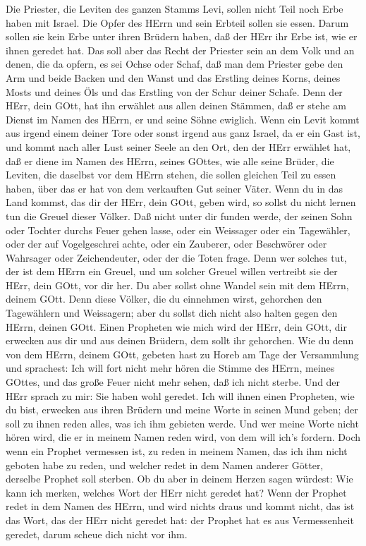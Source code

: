  Die Priester, die Leviten des ganzen Stamms Levi, sollen
nicht Teil noch Erbe haben mit Israel. Die Opfer des HErrn und sein
Erbteil sollen sie essen.  Darum sollen sie kein Erbe unter
ihren Brüdern haben, daß der HErr ihr Erbe ist, wie er ihnen geredet
hat.  Das soll aber das Recht der Priester sein an dem Volk
und an denen, die da opfern, es sei Ochse oder Schaf, daß man dem
Priester gebe den Arm und beide Backen und den Wanst  und
das Erstling deines Korns, deines Mosts und deines Öls und das Erstling
von der Schur deiner Schafe.  Denn der HErr, dein GOtt, hat
ihn erwählet aus allen deinen Stämmen, daß er stehe am Dienst im Namen
des HErrn, er und seine Söhne ewiglich.  Wenn ein Levit
kommt aus irgend einem deiner Tore oder sonst irgend aus ganz Israel, da
er ein Gast ist, und kommt nach aller Lust seiner Seele an den Ort, den
der HErr erwählet hat,  daß er diene im Namen des HErrn,
seines GOttes, wie alle seine Brüder, die Leviten, die daselbst vor dem
HErrn stehen,  die sollen gleichen Teil zu essen haben, über
das er hat von dem verkauften Gut seiner Väter.  Wenn du in
das Land kommst, das dir der HErr, dein GOtt, geben wird, so sollst du
nicht lernen tun die Greuel dieser Völker.  Daß nicht unter
dir funden werde, der seinen Sohn oder Tochter durchs Feuer gehen lasse,
oder ein Weissager oder ein Tagewähler, oder der auf Vogelgeschrei
achte, oder ein Zauberer,  oder Beschwörer oder Wahrsager
oder Zeichendeuter, oder der die Toten frage.  Denn wer
solches tut, der ist dem HErrn ein Greuel, und um solcher Greuel willen
vertreibt sie der HErr, dein GOtt, vor dir her.  Du aber
sollst ohne Wandel sein mit dem HErrn, deinem GOtt.  Denn
diese Völker, die du einnehmen wirst, gehorchen den Tagewählern und
Weissagern; aber du sollst dich nicht also halten gegen den HErrn,
deinen GOtt.  Einen Propheten wie mich wird der HErr, dein
GOtt, dir erwecken aus dir und aus deinen Brüdern, dem sollt ihr
gehorchen.  Wie du denn von dem HErrn, deinem GOtt, gebeten
hast zu Horeb am Tage der Versammlung und sprachest: Ich will fort nicht
mehr hören die Stimme des HErrn, meines GOttes, und das große Feuer
nicht mehr sehen, daß ich nicht sterbe.  Und der HErr
sprach zu mir: Sie haben wohl geredet.  Ich will ihnen
einen Propheten, wie du bist, erwecken aus ihren Brüdern und meine Worte
in seinen Mund geben; der soll zu ihnen reden alles, was ich ihm
gebieten werde.  Und wer meine Worte nicht hören wird, die
er in meinem Namen reden wird, von dem will ich's fordern. 
Doch wenn ein Prophet vermessen ist, zu reden in meinem Namen, das ich
ihm nicht geboten habe zu reden, und welcher redet in dem Namen anderer
Götter, derselbe Prophet soll sterben.  Ob du aber in
deinem Herzen sagen würdest: Wie kann ich merken, welches Wort der HErr
nicht geredet hat?  Wenn der Prophet redet in dem Namen des
HErrn, und wird nichts draus und kommt nicht, das ist das Wort, das der
HErr nicht geredet hat: der Prophet hat es aus Vermessenheit geredet,
darum scheue dich nicht vor ihm.

